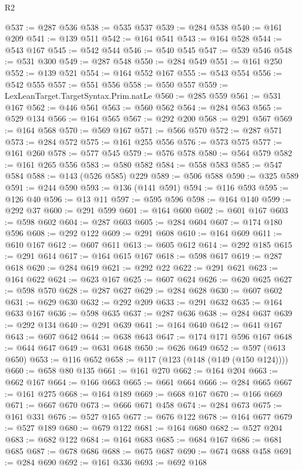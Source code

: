 \begin{lexlean}{R2}
\begin{coremodule}
@537 := @287 @536
@538 := @535 @537
@539 := @284 @538
@540 := @161 @209
@541 := @139 @511
@542 := @164 @541
@543 := @164 @528
@544 := @543 @167
@545 := @542 @544
@546 := @540 @545
@547 := @539 @546
@548 := @531 @300
@549 := @287 @548
@550 := @284 @549
@551 := @161 @250
@552 := @139 @521
@554 := @164 @552 @167
@555 := @543 @554
@556 := @542 @555
@557 := @551 @556
@558 := @550 @557
@559 := LexLeanTarget.TargetSyntax.Prim.natLe
@560 := @285 @559
@561 := @531 @167
@562 := @446 @561
@563 := @560 @562
@564 := @284 @563
@565 := @529 @134
@566 := @164 @565
@567 := @292 @200
@568 := @291 @567
@569 := @164 @568
@570 := @569 @167
@571 := @566 @570
@572 := @287 @571
@573 := @284 @572
@575 := @161 @255 @556
@576 := @573 @575
@577 := @161 @260
@578 := @577 @545
@579 := @576 @578
@580 := @564 @579
@582 := @161 @265 @556
@583 := @580 @582
@584 := @558 @583
@585 := @547 @584
@588 := @143 (@526 @585) @229
@589 := @506 @588
@590 := @325 @589
@591 := @244 @590
@593 := @136 (@141 @591)
@594 := @116 @593
@595 := @126 @40
@596 := @13 @11
@597 := @595 @596
@598 := @164 @140
@599 := @292 @37
@600 := @291 @599
@601 := @164 @600
@602 := @601 @167
@603 := @598 @602
@604 := @287 @603
@605 := @284 @604
@607 := @174 @180 @596
@608 := @292 @122
@609 := @291 @608
@610 := @164 @609
@611 := @610 @167
@612 := @607 @611
@613 := @605 @612
@614 := @292 @185
@615 := @291 @614
@617 := @164 @615 @167
@618 := @598 @617
@619 := @287 @618
@620 := @284 @619
@621 := @292 @22
@622 := @291 @621
@623 := @164 @622
@624 := @623 @167
@625 := @607 @624
@626 := @620 @625
@627 := @598 @570
@628 := @287 @627
@629 := @284 @628
@630 := @607 @602
@631 := @629 @630
@632 := @292 @209
@633 := @291 @632
@635 := @164 @633 @167
@636 := @598 @635
@637 := @287 @636
@638 := @284 @637
@639 := @292 @134
@640 := @291 @639
@641 := @164 @640
@642 := @641 @167
@643 := @607 @642
@644 := @638 @643
@647 := @174 @171 @596 @167
@648 := @644 @647
@649 := @631 @648
@650 := @626 @649
@652 := @597 (@613 @650)
@653 := @116 @652
@658 := @117 (@123 (@148 (@149 (@150 @124))))
@660 := @658 @80 @135
@661 := @161 @270
@662 := @164 @204
@663 := @662 @167
@664 := @166 @663
@665 := @661 @664
@666 := @284 @665
@667 := @161 @275
@668 := @164 @189
@669 := @668 @167
@670 := @166 @669
@671 := @667 @670
@673 := @666 @671 @458
@674 := @284 @673
@675 := @161 @331
@676 := @527 @165
@677 := @676 @122
@678 := @164 @677
@679 := @527 @189
@680 := @679 @122
@681 := @164 @680
@682 := @527 @204
@683 := @682 @122
@684 := @164 @683
@685 := @684 @167
@686 := @681 @685
@687 := @678 @686
@688 := @675 @687
@690 := @674 @688 @458
@691 := @284 @690
@692 := @161 @336
@693 := @692 @168

\end{coremodule}
\end{lexlean}

